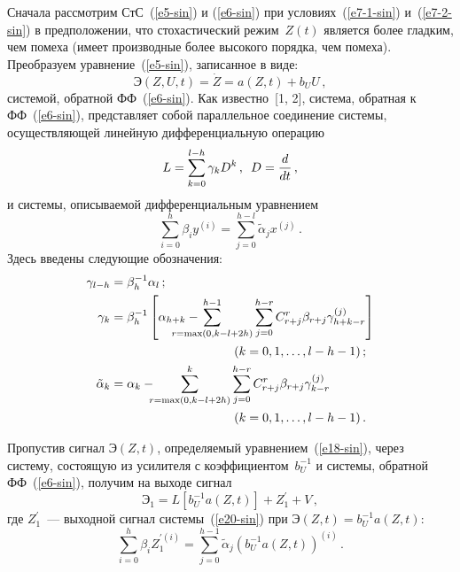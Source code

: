 \begin{multicols}{2}
  Сначала рассмотрим СтС~(\ref{e5-sin}) и (\ref{e6-sin}) при 
  условиях~(\ref{e7-1-sin}) и~(\ref{e7-2-sin}) в предположении, что 
стохастический режим~$Z(t)$ является более гладким, чем помеха (имеет 
производные более высокого порядка, чем помеха). Преобразуем 
урав\-не\-ние~(\ref{e5-sin}), записанное в виде:
  \begin{equation}
  \mathrm{Э}\left( Z,U,t\right) =\dot{Z}=a(Z,t)+b_U U\,,
  \label{e18-sin}
  \end{equation}
сис\-те\-мой, обратной ФФ~(\ref{e6-sin}). Как известно~[1, 2], сис\-те\-ма, обратная к 
ФФ~(\ref{e6-sin}), представляет собой параллельное соединение сис\-те\-мы, 
осуществляющей линейную дифференциальную операцию
\begin{equation*}
L=\sum\limits_{k=0}^{l-h} \gamma_k D^k\,,\enskip D=\displaystyle\frac{\displaystyle d\mathstrut}{\displaystyle dt\mathstrut}\,,
\end{equation*}
и сис\-те\-мы, описываемой дифференциальным урав\-не\-нием
\begin{equation}
\sum\limits_{i=0}^h \beta_i y^{(i)} =\sum\limits_{j=0}^{h-l} \tilde{\alpha}_j 
x^{(j)}\,.
\label{e20-sin}
\end{equation}
    Здесь введены следующие обозначения:
  \begin{align*}
  \gamma_{l-h}&=\beta_h^{-1}\alpha_l\,;\\
  \gamma_k&=\beta_h^{-1}\left[ 
\alpha_{h+k}-\hspace*{-5mm}\hspace*{-9.52328pt}\sum\limits^{h-1}_{r=\max(0,k-l+2h)} 
\sum\limits_{j=0}^{h-r} 
C^r_{r+j}\beta_{r+j}\gamma^{(j)}_{h+k-r}\right] \\
&\hspace*{35mm}(k=0,1,\ldots , l-h-1)\,;\\
  \tilde{\alpha}_k&=\alpha_k- \hspace*{-2mm}\sum\limits^k_{r=\max(0,k-l+2h)} \sum\limits_{j=0}^{h-r}
C^r_{r+j} \beta_{r+j} \gamma^{(j)}_{k-r}\\
&\hspace*{35mm}(k=0,1,\ldots , l-h-1)\,.
  \end{align*}
  
  Пропустив сигнал $\mathrm{Э}(Z,t)$, определяемый 
  урав\-не\-ни\-ем~(\ref{e18-sin}), через сис\-те\-му, со\-сто\-ящую из усилителя с 
коэффициентом~$b_U^{-1}$ и сис\-те\-мы, обратной ФФ~(\ref{e6-sin}), получим 
на выходе сигнал
  \begin{equation*}
  \mathrm{Э}_1=L\left[ b_U^{-1} a(Z,t)\right] +Z_1^\prime +V\,,
  \end{equation*}
где $Z_1^\prime$~--- выходной сигнал сис\-те\-мы~(\ref{e20-sin}) при 
$\mathrm{Э}(Z,t)=b_U^{-1} a(Z,t)$:
\begin{equation}
\sum\limits_{i=0}^h \beta_i Z_1^{\prime(i)}= \sum\limits_{j=0}^{h-1} 
\tilde{\alpha}_j\left( b_U^{-1} a(Z,t)\right)^{(i)}\,.
\label{e23-sin}
\end{equation}
  

\end{multicols}
